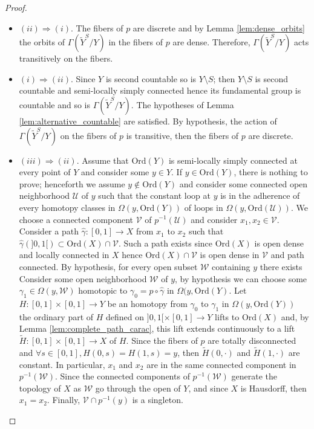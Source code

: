 \documentclass[a4paper,12pt]{article}
\def\U{\mathcal U}
\def\V{\mathcal V}
\def\V{\mathcal V}
\def\W{\mathcal W}
\def\U{\mathcal{U}}
\def\ord{\mathrm{Ord}}
\begin{document}
\begin{proof}\

  \begin{itemize}

   \item $(ii)\Rightarrow (i)$. The fibers of $p$ are discrete and by Lemma \ref{lem:dense_orbits} the orbits of $\Gamma(\widetilde Y^S/Y)$ in the fibers of $p$ are dense. Therefore, $\Gamma(\widetilde Y^S/Y)$ acts transitively on the fibers.
   \item $(i)\Rightarrow (ii)$. Since $Y$ is second countable so is $Y\setminus S$; then  $Y\setminus S$ is second countable and semi-locally simply connected hence its fundamental group is countable and so is $\Gamma(\widetilde Y^S/Y)$. The hypotheses of Lemma \ref{lem:alternative_countable} are satisfied. By hypothesis, the action of $\Gamma(\widetilde Y^S/Y)$  on the fibers of $p$ is transitive, then the fibers of $p$ are discrete.
   \item $(iii)\Rightarrow (ii)$. Assume that $\ord(Y)$ is semi-locally simply connected at every point of $Y$ and consider some $y\in Y$. If $y\in \ord(Y)$, there is nothing to prove; henceforth we assume $y\notin \ord(Y)$ and consider some connected open neighborhood $\U$ of $y$ such that the constant loop at $y$ is in the adherence of every homotopy classes in $\Omega(y,\ord(Y))$ of loops in $\Omega(y,\ord(\U))$. We choose a connected component $\V$ of $p^{-1}(\U)$ and consider $x_1,x_2 \in \V$. Consider a path $\hat\gamma:[0,1]\rightarrow X$ from $x_1$ to $x_2$ such that $\hat\gamma(]0,1[)\subset \ord(X)\cap \V$. Such a path exists since $\ord(X)$ is open dense and locally connected in $X$ hence $\ord(X)\cap \V$ is open dense in $\V$ and path connected. By hypothesis, for every open subset $\W$ containing $y$ there exists Consider some open neighborhood $\W$ of $y$, by hypothesis we can choose some $\gamma_1\in \Omega(y,\W)$ homotopic to $\gamma_0=p\circ \hat\gamma$ in $\Omega(y,\ord(Y)$.  Let $H:[0,1]\times[0,1]\rightarrow Y$ be an homotopy from $\gamma_0$ to $\gamma_1$ in $\Omega(y,\ord(Y))$ the ordinary part of $H$ defined on 
   $]0,1[\times [0,1]\rightarrow Y$ lifts to $\ord(X)$ and, by Lemma \ref{lem:complete_path_carac}, this lift extends continuously to a lift $\widetilde H:[0,1]\times [0,1]\rightarrow X$ of $H$. Since the fibers of $p$ are totally disconnected and $\forall s\in [0,1], H(0,s)=H(1,s)=y$, then $\widetilde H(0,\cdot)$ and $\widetilde H(1,\cdot)$ are constant. In particular, $x_1$ and $x_2$ are in the same connected component in $p^{-1}(\W)$. Since the connected components of $p^{-1}(\W)$ generate the topology of $X$ as $\W$ go through the open of $Y$, and since $X$ is Hausdorff, then $x_1=x_2$.
   Finally, $\V\cap p^{-1}(y)$  is a singleton. 
 

\end{itemize}
\end{proof}
\end{document}
